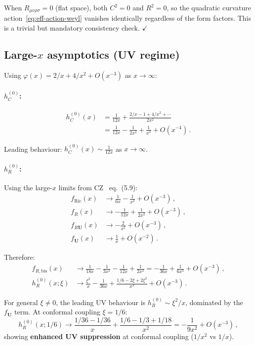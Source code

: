\documentclass[11pt,a4paper]{article}
\theoremstyle{definition}
\theoremstyle{remark}
\begin{document}
When $R_{\mu\nu\rho\sigma} = 0$ (flat space), both $C^2 = 0$
and $R^2 = 0$, so the quadratic curvature
action~\eqref{eq:eff-action-weyl} vanishes identically
regardless of the form factors.  This is a trivial but mandatory
consistency check. \quad$\checkmark$


\subsection{Large-$x$ asymptotics (UV regime)}

Using $\varphi(x) = 2/x + 4/x^2 + O(x^{-3})$ as $x \to \infty$:

\paragraph{$h_C^{(0)}$:}
\begin{align}
  h_C^{(0)}(x) &= \frac{1}{12x}
  + \frac{2/x - 1 + 4/x^2 + \cdots}{2x^2}
  \nonumber\\
  &= \frac{1}{12x} - \frac{1}{2x^2} + \frac{1}{x^3} + O(x^{-4})\,.
  \label{eq:hC-UV}
\end{align}

Leading behaviour: $h_C^{(0)}(x) \sim \frac{1}{12x}$ as
$x \to \infty$.

\paragraph{$h_R^{(0)}$:}
Using the large-$x$ limits from CZ~\cite{CZ2012} eq.~(5.9):
\begin{align*}
  f_{\text{Ric}}(x) &\to \frac{1}{6x} - \frac{1}{x^2} + O(x^{-3})\,,\\
  f_R(x) &\to -\frac{1}{12x} + \frac{1}{2x^2} + O(x^{-3})\,,\\
  f_{R\mathbf{U}}(x) &\to -\frac{2}{x^2} + O(x^{-3})\,,\\
  f_{\mathbf{U}}(x) &\to \frac{1}{x} + O(x^{-2})\,.
\end{align*}

Therefore:
\begin{align}
  f_{R,\text{bis}}(x) &\to \frac{1}{18x} - \frac{1}{3x^2}
  - \frac{1}{12x} + \frac{1}{2x^2}
  = -\frac{1}{36x} + \frac{1}{6x^2} + O(x^{-3})\,,
  \label{eq:fRbis-UV}\\[4pt]
  h_R^{(0)}(x;\xi) &\to \frac{\xi^2}{x}
  - \frac{1}{36x}
  + \frac{1/6 - 2\xi + 2\xi^2}{x^2} + O(x^{-3})\,.
  \label{eq:hR-UV}
\end{align}

For general $\xi \neq 0$, the leading UV behaviour is
$h_R^{(0)} \sim \xi^2/x$, dominated by the
$f_{\mathbf{U}}$ term.  At conformal coupling $\xi = 1/6$:
\begin{equation}
  h_R^{(0)}(x;1/6) \to \frac{1/36 - 1/36}{x}
  + \frac{1/6 - 1/3 + 1/18}{x^2}
  = -\frac{1}{9x^2} + O(x^{-3})\,,
  \label{eq:hR-UV-conformal}
\end{equation}
showing \textbf{enhanced UV suppression} at conformal coupling
($1/x^2$ vs $1/x$).
\end{document}
